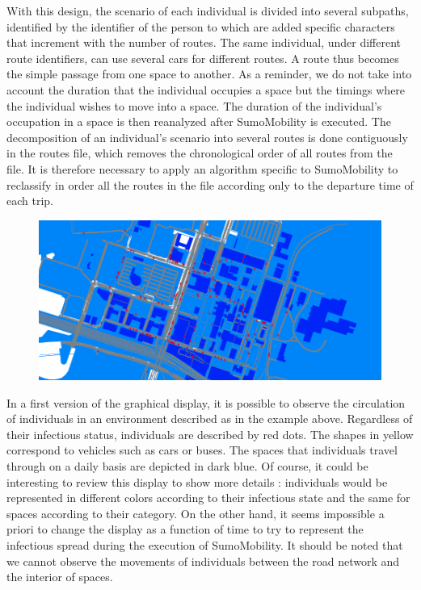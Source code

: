 With this design, the scenario of each individual is divided into several subpaths, identified by the identifier of the person to which are added specific characters that increment with the number of routes. The same individual, under different route identifiers, can use several cars for different routes. A route thus becomes the simple passage from one space to another. As a reminder, we do not take into account the duration that the individual occupies a space but the timings where the individual wishes to move into a space. The duration of the individual's occupation in a space is then reanalyzed after SumoMobility is executed. The decomposition of an individual's scenario into several routes is done contiguously in the routes file, which removes the chronological order of all routes from the file. It is therefore necessary to apply an algorithm specific to SumoMobility to reclassify in order all the routes in the file according only to the departure time of each trip.\\

\begin{figure}[h]
  \centering
  \includegraphics[width=\linewidth]{Media/SumoMobility.png}
  \caption{}
  \label{fig:sumomobility}
\end{figure}

In a first version of the graphical display, it is possible to observe the circulation of individuals in an environment described as in the example above. Regardless of their infectious status, individuals are described by red dots. The shapes in yellow correspond to vehicles such as cars or buses. The spaces that individuals travel through on a daily basis are depicted in dark blue. Of course, it could be interesting to review this display to show more details : individuals would be represented in different colors according to their infectious state and the same for spaces according to their category. On the other hand, it seems impossible a priori to change the display as a function of time to try to represent the infectious spread during the execution of SumoMobility. It should be noted that we cannot observe the movements of individuals between the road network and the interior of spaces.\\


